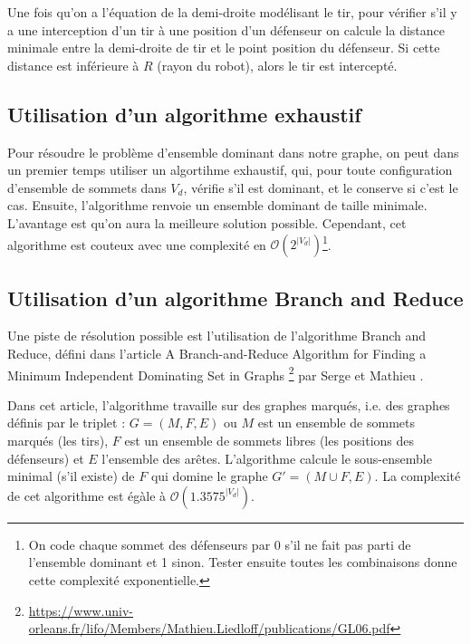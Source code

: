 \documentclass{article}
\begin{document}
Une fois qu'on a l'équation de la demi-droite modélisant le tir, pour vérifier s'il y a une interception d'un tir à une position d'un défenseur on calcule la distance minimale entre la demi-droite de tir et le point position du défenseur. Si cette distance est inférieure à $R$ (rayon du robot), alors le tir est intercepté.

\subsection{Utilisation d'un algorithme exhaustif}
Pour résoudre le problème d'ensemble dominant dans notre graphe, on peut dans un premier temps utiliser un algortihme exhaustif, qui, pour toute configuration d'ensemble de sommets dans $V_d$, vérifie s'il est dominant, et le conserve si c'est le cas. Ensuite, l'algorithme renvoie un ensemble dominant de taille minimale. L'avantage est qu'on aura la meilleure solution possible. Cependant, cet algorithme est couteux avec une complexité en $\mathcal{O}(2^{|V_d|})$\footnote{On code chaque sommet des défenseurs par 0 s'il ne fait pas parti de l'ensemble dominant et 1 sinon. Tester ensuite toutes les combinaisons donne cette complexité exponentielle.}.

\subsection{Utilisation d'un algorithme Branch and Reduce}

Une piste de résolution possible est l'utilisation de l'algorithme Branch and Reduce, défini dans l'article \og{} A Branch-and-Reduce Algorithm for Finding a Minimum Independent Dominating Set in Graphs \fg{}\footnote{\url{https://www.univ-orleans.fr/lifo/Members/Mathieu.Liedloff/publications/GL06.pdf}} par Serge  et Mathieu .

Dans cet article, l'algorithme travaille sur des graphes marqués, i.e. des graphes définis par le triplet : $G = (M, F, E)$ ou $M$ est un ensemble de sommets marqués (les tirs), $F$ est un ensemble de sommets libres (les positions des défenseurs) et $E$ l'ensemble des arêtes. L'algorithme calcule le sous-ensemble minimal (s'il existe) de $F$ qui domine le graphe $G' = (M \cup F, E)$. La complexité de cet algorithme est égàle à $\mathcal{O}(1.3575^{|V_d|})$.


\end{document}
